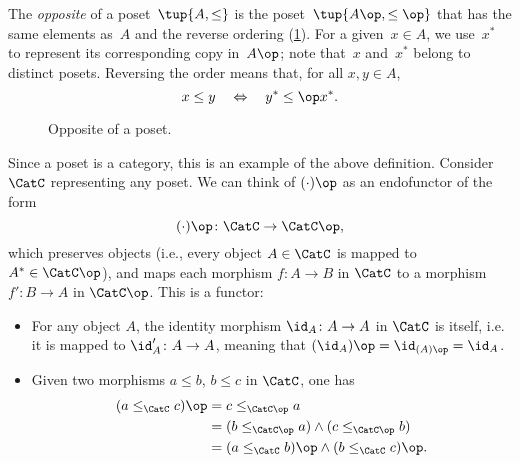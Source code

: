 \begin{example}
    The \emph{opposite} of a  poset~$\tup{A, \leq} $ is the poset~$\tup{A\op, \leq\op}$ that has the same elements as~$A$ and the reverse ordering (\cref{fig:opposite}).
    For a given~$x \in A$, we use~$x^*$ to represent its corresponding copy in~$A\op$;
    note that~$x$ and~$x^*$ belong to distinct posets.
    Reversing the order means that, for all $x,y\in A$,
    \begin{equation}
        x \leq y \quad \Leftrightarrow \quad y^* \leq\op x^*.
    \end{equation}
    \begin{figure}[tbh]
   \centering
   \caption{Opposite of a poset.\label{fig:opposite}}
\end{figure}
Since a poset is a category, this is an example of the above definition. Consider $\CatC$ representing any poset. We can think of $(\cdot)\op$ as an endofunctor of the form
\begin{equation}
    (\cdot)\op\colon \CatC \to \CatC\op,
\end{equation}
which preserves objects (i.e., every object $A \in \CatC$ is mapped to $A^*\in \CatC\op$), and maps each morphism $f\colon A\to B$ in $\CatC$ to a morphism $f'\colon B\to A$ in $\CatC\op$. This is a functor:
\begin{itemize}
    \item For any object $A$, the identity morphism $\id_A\colon A\to A$ in $\CatC$ is itself, i.e. it is mapped to $\id_A'\colon A\to A$, meaning that $(\id_A)\op=\id_{(A)\op}=\id_A$.
    \item Given two morphisms $a\leq b$, $b\leq c$ in $\CatC$, one has
    \begin{equation}
        \begin{aligned}
        (a\leq_{\CatC} c)\op &=c\leq_{\CatC\op} a\\
        &=(b\leq_{\CatC\op} a)\wedge (c\leq_{\CatC\op}b)\\
        &=(a\leq_{\CatC} b)\op \wedge (b\leq_{\CatC} c)\op.
        \end{aligned}
    \end{equation}
\end{itemize}
\end{example}

